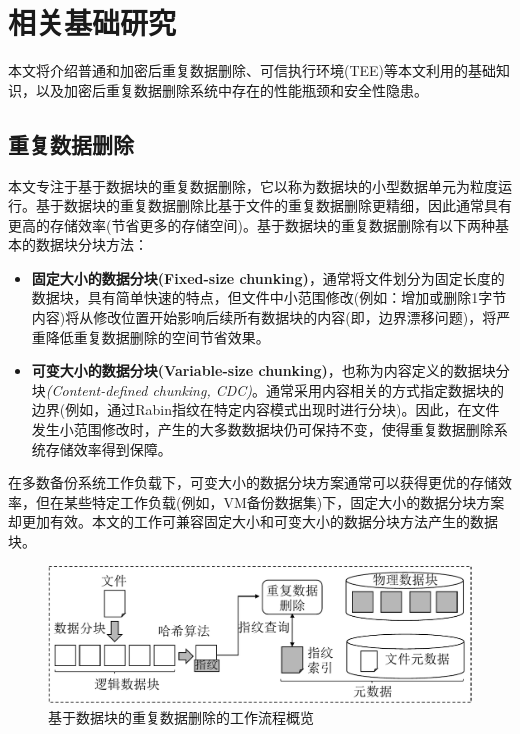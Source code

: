 \chapter{相关基础研究}
\label{chapter:background}

本文将介绍普通和加密后重复数据删除、可信执行环境(TEE)等本文利用的基础知识，以及加密后重复数据删除系统中存在的性能瓶颈和安全性隐患。

\section{重复数据删除}
\label{sec:background-deduplication}

本文专注于基于数据块的重复数据删除，它以称为数据块的小型数据单元为粒度运行。基于数据块的重复数据删除比基于文件的重复数据删除更精细，因此通常具有更高的存储效率(节省更多的存储空间)。基于数据块的重复数据删除有以下两种基本的数据块分块方法：

\begin{itemize}[leftmargin=0em]
    \item \textbf{固定大小的数据分块(Fixed-size chunking)}，通常将文件划分为固定长度的数据块，具有简单快速的特点，但文件中小范围修改(例如：增加或删除1字节内容)将从修改位置开始影响后续所有数据块的内容(即，边界漂移问题\cite{muthitacharoen2001low})，将严重降低重复数据删除的空间节省效果。
    \item \textbf{可变大小的数据分块(Variable-size chunking)}，也称为内容定义的数据块分块\textit{(Content-defined chunking, CDC)}。通常采用内容相关的方式指定数据块的边界(例如，通过Rabin指纹\cite{rabin1981fingerprinting}在特定内容模式出现时进行分块)。因此，在文件发生小范围修改时，产生的大多数数据块仍可保持不变，使得重复数据删除系统存储效率得到保障。
\end{itemize}

在多数备份系统工作负载\cite{zhu2008avoiding,lillibridge2009sparse}下，可变大小的数据分块方案通常可以获得更优的存储效率，但在某些特定工作负载(例如，VM备份数据集\cite{jin2009effectiveness})下，固定大小的数据分块方案却更加有效。本文的工作可兼容固定大小和可变大小的数据分块方法产生的数据块。

\begin{figure}[!htb]
    \small
    \centering
    \includegraphics[width=\textwidth]{pic/background/chunk-based-dedup-arch.pdf}
    \caption{基于数据块的重复数据删除的工作流程概览}
    \label{fig:chunk-based-dedup-flow}
\end{figure}


